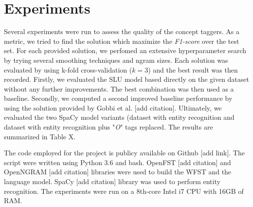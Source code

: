 \documentclass[11pt,a4paper]{article}
\begin{document}
\section{Experiments}

Several experiments were run to assess the quality of 
the concept taggers. As a metric, we tried to find the solution which maximize the \textit{F1-score} over the test set. For each provided solution, we perfomed an extensive hyperparameter search by trying several smoothing techniques and ngram sizes. Each solution was evaluated by using k-fold cross-validation ($k=3$) and the best result was then recorded. Firstly, we evaluated the SLU model based directly on the given dataset without any further improvements. The best combination was then used as a baseline. Secondly, we computed a second improved baseline performance by using the solution provided by Gobbi et al. [add citation]. Ultimately, we evaluated the two SpaCy model variants (dataset with entity recognition and dataset with entity recognition plus "\textit{O}" tags replaced. The results are summarized in Table X.

The code employed for the project is publicy available on Github [add link]. The script were written using Python 3.6 and bash. OpenFST [add citation] and OpenNGRAM [add citation] libraries were used to build the WFST and the language model. SpaCy [add citation] library was used to perform entity recognition.
The experiments were run on a 8th-core Intel i7 CPU with 16GB of RAM. 
\end{document}
